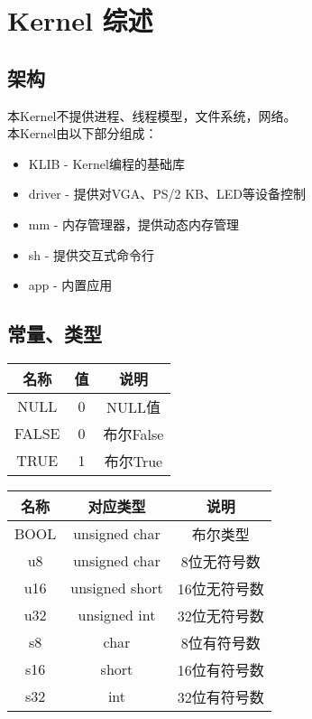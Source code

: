 %
% 
% 
% 
% 
% 
% 
%
\chapter{Kernel 综述}
\section{架构}
本Kernel不提供进程、线程模型，文件系统，网络。\\
本Kernel由以下部分组成：
\begin{itemize}
    \item KLIB - Kernel编程的基础库
    \item driver - 提供对VGA、PS/2 KB、LED等设备控制
    \item mm - 内存管理器，提供动态内存管理
    \item sh - 提供交互式命令行
    \item app - 内置应用
\end{itemize}
\section{常量、类型}
\begin{tabular}{|c|c|c|}
    \hline
    名称 & 值 & 说明\\\hline
    NULL & 0 & NULL值\\\hline
    FALSE & 0 & 布尔False\\\hline
    TRUE & 1 & 布尔True\\\hline
\end{tabular}
\begin{tabular}{|c|c|c|}
    \hline
    名称 & 对应类型 & 说明\\\hline
    BOOL & unsigned char & 布尔类型\\\hline
    u8 & unsigned char & 8位无符号数\\\hline
    u16 & unsigned short & 16位无符号数\\\hline
    u32 & unsigned int & 32位无符号数\\\hline
    s8 & char & 8位有符号数\\\hline
    s16 & short & 16位有符号数\\\hline
    s32 & int & 32位有符号数\\\hline
\end{tabular}